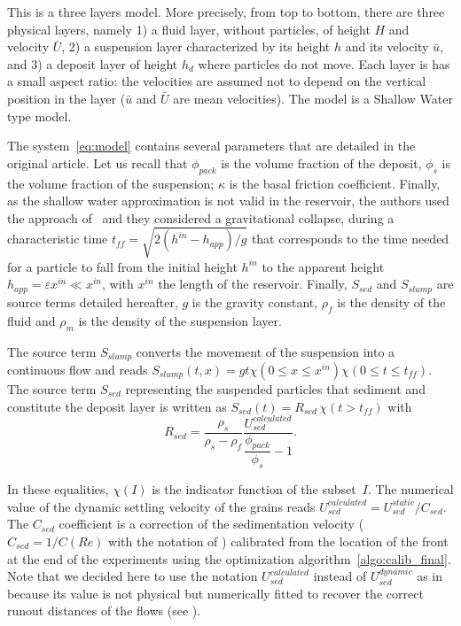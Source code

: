 This is a three layers model. More precisely, from top to bottom, there are three physical layers, namely 1) a fluid layer, without particles, of height $H$ and velocity $\bar{U}$, 2) a suspension layer characterized by its height $h$ and its velocity $\bar{u}$, and 3) a deposit layer of height $h_d$ where particles do not move.
Each layer is has a small aspect ratio: the velocities are assumed not to depend on the vertical position in the layer ($\bar{u}$ and $\bar{U}$ are mean velocities). The model is a Shallow Water type model.

The system~\eqref{eq:model} contains several parameters that are detailed in the original article. Let us recall that $\phi_{pack}$ is the volume fraction of the deposit, $\phi_s$ is the volume fraction of the suspension; $\kappa$ is the basal friction coefficient.
Finally, as the shallow water approximation is not valid in the reservoir, the authors used the approach of~\cite{Larrieu} and they considered a gravitational collapse, during  a characteristic time $t_{f\!f} = \sqrt{2 (h^{in} - h_{app})/g}$
that corresponds to the time needed for a particle to fall from the initial height $h^{in}$ to the apparent height $h_{app} = \varepsilon x^{in} \ll x^{in}$, with $x^{in}$ the length of the reservoir.
Finally, $S_{sed}$ and $S_{slump}$ are source terms detailed hereafter, $g$ is the gravity constant, $\rho_f$ is the density of the fluid and $\rho_m$ is the density of the suspension layer.

The source term $S_{slump}$ converts the movement of the suspension into a continuous flow and reads
$S_{slump}(t,x) = gt \chi( 0 \leq x \leq x^{in})\chi( 0 \leq t \leq t_{f\!f})$. The source term $S_{sed}$ representing the suspended particles that sediment and constitute the deposit layer is written as
$S_{sed}(t) = R_{sed} \, \chi(t > t_{f\!f}) $ with $$R_{sed} = \dfrac{\rho_s}{\rho_s - \rho_f} \dfrac{U_{sed}^{calculated}}{\dfrac{\phi_{pack}}{\phi_s} - 1}. $$

In these equalities, $\chi(I)$ is the indicator function of the subset~$I$.
The numerical value of the dynamic settling velocity of the grains reads $U_{sed}^{calculated} = U_{sed}^{static}/C_{sed}$.
The $C_{sed}$ coefficient is a correction of the sedimentation velocity ($C_{sed} = 1 / C(Re)$ with the notation of \cite{Andrea}) calibrated from the location of the front at the end of the experiments using the optimization algorithm~\ref{algo:calib_final}. Note that we decided here to use the notation $U^{calculated}_{sed}$ instead of $U_{sed}^{dynamic}$ as in \cite{Andrea} because its value is not physical but numerically fitted to recover the correct runout distances of the flows (see \cite[caption of figure 10 (b)]{Andrea}).

